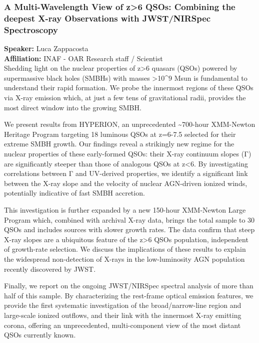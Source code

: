 \hypertarget{abs-55}{}
\subsubsection*{A Multi-Wavelength View of z>6 QSOs: Combining the deepest X-ray Observations with JWST/NIRSpec Spectroscopy}
\textbf{Speaker:} Luca Zappacosta \\
\textbf{Affiliation:} INAF - OAR \textperiodcentered{} Research staff / Scientist\\
Shedding light on the nuclear properties of z>6 quasars (QSOs) powered by supermassive black holes (SMBHs) with masses >10\textasciicircum{}9 Msun is fundamental to understand their rapid formation. We probe the innermost regions of these QSOs via X-ray emission which, at just a few tens of gravitational radii, provides the most direct window into the growing SMBH.

We present results from HYPERION, an unprecedented \textasciitilde{}700-hour XMM-Newton Heritage Program targeting 18 luminous QSOs at z=6-7.5 selected for their extreme SMBH growth. Our findings reveal a strikingly new regime for the nuclear properties of these early-formed QSOs: their X-ray continuum slopes (Γ) are significantly steeper than those of analogous QSOs at z<6. By investigating correlations between Γ and UV-derived properties, we identify a significant link between the X-ray slope and the velocity of nuclear AGN-driven ionized winds, potentially indicative of fast SMBH accretion.

This investigation is further expanded by a new 150-hour XMM-Newton Large Program which, combined with archival X-ray data, brings the total sample to 30 QSOs and includes sources with slower growth rates. The data confirm that steep X-ray slopes are a ubiquitous feature of the z>6 QSOs population, independent of growth-rate selection. We discuss the implications of these results to explain the widespread non-detection of X-rays in the low-luminosity AGN population recently discovered by JWST.

Finally, we report on the ongoing JWST/NIRSpec spectral analysis of more than half of this sample. By characterizing the rest-frame optical emission features, we provide the first systematic investigation of the broad/narrow-line region and large-scale ionized outflows, and their link with the innermost X-ray emitting corona, offering an unprecedented, multi-component view of the most distant QSOs currently known.

